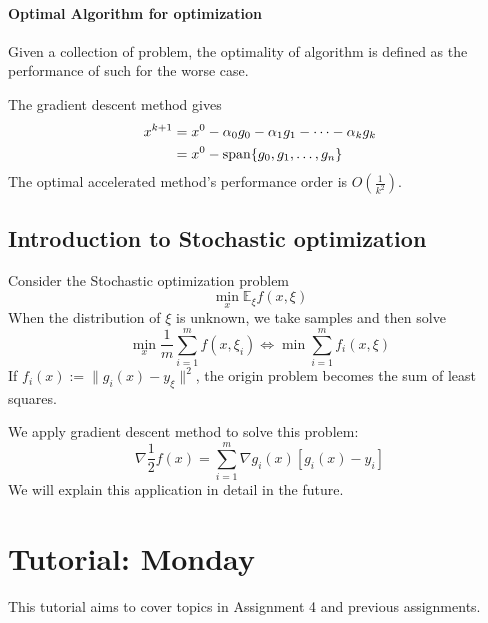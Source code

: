 \paragraph{Optimal Algorithm for optimization}
Given a collection of problem, the optimality of algorithm is defined as the performance of such for the worse case.

The gradient descent method gives
\begin{align*}
x^{k+1}&=x^0-\alpha_0g_0-\alpha_1g_1-\cdots-\alpha_kg_k\\
&=x^0-\operatorname{span}\{g_0,g_1,\dots,g_n\}
\end{align*}
The optimal accelerated method's performance order is $O(\frac{1}{k^2})$.

\subsection{Introduction to Stochastic optimization}
Consider the Stochastic optimization problem
\[
\min_x\mathbb{E}_{\xi}f(x,\xi)
\]
When the distribution of $\xi$ is unknown, we take samples and then solve
\[
\min_x\frac{1}{m}\sum_{i=1}^mf(x,\xi_i)\Longleftrightarrow
\min\sum_{i=1}^mf_i(x,\xi)
\]
If $f_i(x):=\|g_i(x) - y_\xi\|^2$, the origin problem becomes the sum of least squares.

We apply gradient descent method to solve this problem:
\[
\nabla \frac{1}{2}f(x)=\sum_{i=1}^m\nabla g_i(x)\left[g_i(x) - y_i\right]
\]
We will explain this application in detail in the future.



\section{Tutorial: Monday}
This tutorial aims to cover topics in Assignment 4 and previous assignments.

